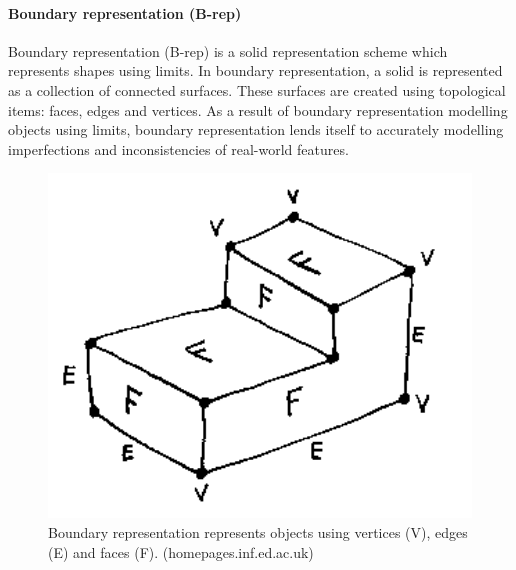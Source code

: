 \documentclass[11pt,a4paper]{report}
\begin{document}
				\paragraph{Boundary representation (B-rep)}
					Boundary representation (B-rep) is a solid representation scheme which represents shapes using limits. In boundary representation, a solid is represented as a collection of connected surfaces. These surfaces are created using topological items: faces, edges and vertices. As a result of boundary representation modelling objects using limits, boundary representation lends itself to accurately modelling imperfections and inconsistencies of real-world features.
					\cite{hongxin_zhang_introduction_2007}
					\begin{figure}[H]
						\centering
						\includegraphics[width=1\textwidth]{brep}
						\caption[Boundary representation]{Boundary representation represents objects using vertices (V), edges (E) and faces (F). (homepages.inf.ed.ac.uk)}
					\end{figure}
				
\end{document}
